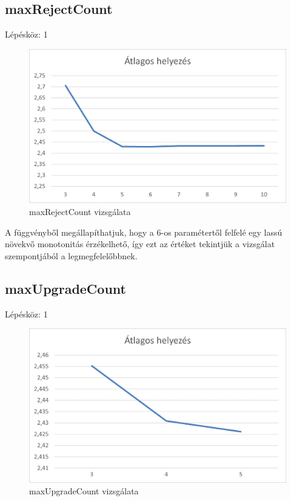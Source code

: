 \subsection{maxRejectCount}
Lépésköz: 1
\begin{figure}[h!]
\centering
\includegraphics[scale=0.2]{images/ff.png}
\caption{maxRejectCount vizsgálata}
\label{fig:ff}
\end{figure}

A függvényből megállapíthatjuk, hogy a 6-os paramétertől felfelé egy lassú növekvő monotonitás érzékelhető, így ezt az értéket tekintjük a vizsgálat szempontjából a legmegfelelőbbnek.

\subsection{maxUpgradeCount}
Lépésköz: 1
\begin{figure}[h!]
\centering
\includegraphics[scale=0.2]{images/bbb.png}
\caption{maxUpgradeCount vizsgálata}
\label{fig:ff}
\end{figure}

